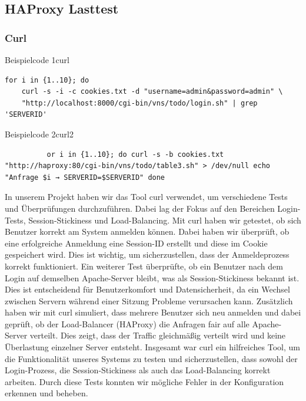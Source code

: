 \subsection{HAProxy Lasttest}
\subsubsection{Curl}

\begin{code}{Beispielcode 1}{curl}
        \begin{verbatim}
for i in {1..10}; do
    curl -s -i -c cookies.txt -d "username=admin&password=admin" \
    "http://localhost:8000/cgi-bin/vns/todo/login.sh" | grep 'SERVERID'

        \end{verbatim}
\end{code}

\begin{code}{Beispielcode 2}{curl2}
        \begin{verbatim}
          or i in {1..10}; do curl -s -b cookies.txt "http://haproxy:80/cgi-bin/vns/todo/table3.sh" > /dev/null echo "Anfrage $i → SERVERID=$SERVERID" done
        \end{verbatim}
\end{code}

In unserem Projekt haben wir das Tool curl verwendet, um verschiedene Tests und Überprüfungen durchzuführen. Dabei lag der Fokus auf den Bereichen Login-Tests, Session-Stickiness und Load-Balancing. Mit curl haben wir getestet, ob sich Benutzer korrekt am System anmelden können. Dabei haben wir überprüft, ob eine erfolgreiche Anmeldung eine Session-ID erstellt und diese im Cookie gespeichert wird. Dies ist wichtig, um sicherzustellen, dass der Anmeldeprozess korrekt funktioniert. Ein weiterer Test überprüfte, ob ein Benutzer nach dem Login auf demselben Apache-Server bleibt, was als Session-Stickiness bekannt ist. Dies ist entscheidend für Benutzerkomfort und Datensicherheit, da ein Wechsel zwischen Servern während einer Sitzung Probleme verursachen kann. Zusätzlich haben wir mit curl simuliert, dass mehrere Benutzer sich neu anmelden und dabei geprüft, ob der Load-Balancer (HAProxy) die Anfragen fair auf alle Apache-Server verteilt. Dies zeigt, dass der Traffic gleichmäßig verteilt wird und keine Überlastung einzelner Server entsteht. Insgesamt war curl ein hilfreiches Tool, um die Funktionalität unseres Systems zu testen und sicherzustellen, dass sowohl der Login-Prozess, die Session-Stickiness als auch das Load-Balancing korrekt arbeiten. Durch diese Tests konnten wir mögliche Fehler in der Konfiguration erkennen und beheben.

